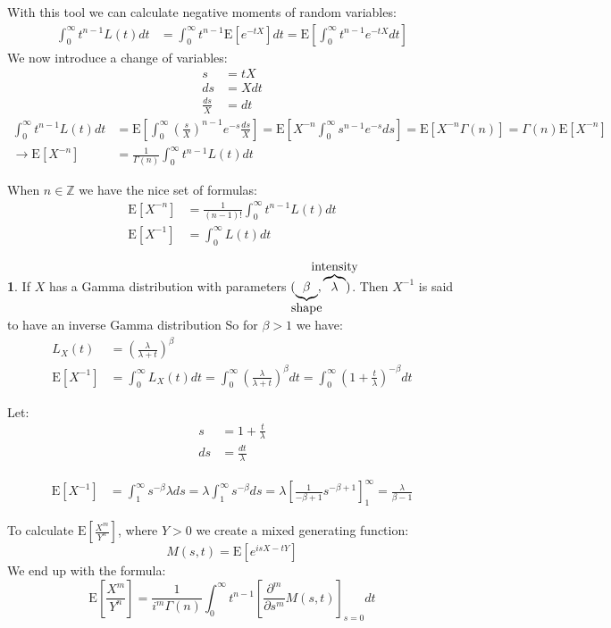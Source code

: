 \documentclass[english,12pt]{article}
\theoremstyle{plain}
\theoremstyle{definition}
\newtheorem*{example}{\protect\examplename}
\theoremstyle{definition} %
\newcommand{\eg}[1]{\begin{example} #1 \end{example} }
\providecommand{\examplename}{Example}
\newcommand{\brac}[1]{\left(#1\right)} %
\newcommand{\sqbrac}[1]{\left[#1\right]} %
\newcommand{\Z}{\mathbb{Z}} %
\newcommand{\ex}[1]{\mbox{E} \left[ #1 \right]}
\begin{document}
With this tool we can calculate negative moments of random variables:
\begin{align*}
\int_0^\infty t^{n-1}L(t)dt&=\int_0^\infty t^{n-1}\ex{e^{-tX}}dt
=\ex{\int_0^\infty t^{n-1}e^{-tX}dt}
\end{align*}
We now introduce a change of variables:
\begin{align*}
s&=tX\\
ds&=Xdt\\
\frac{ds}{X}&=dt
\end{align*}
\begin{align*}
\int_0^\infty t^{n-1}L(t)dt
&=\ex{\int_0^\infty\brac{\frac{s}{X}}^{n-1}e^{-s}\frac{ds}{X}}
=\ex{X^{-n}\int_0^\infty s^{n-1}e^{-s}ds}
=\ex{X^{-n}\Gamma(n)}
=\Gamma(n)\ex{X^{-n}}\\
\rightarrow\ex{X^{-n}}&=\frac{1}{\Gamma(n)}\int_0^\infty t^{n-1}L(t)dt
\end{align*}

When $n\in\Z$ we have the nice set of formulas:
\begin{align*}
\ex{X^{-n}}&=\frac{1}{(n-1)!}\int_0^\infty t^{n-1}L(t)dt\\
\ex{X^{-1}}&=\int_0^\infty L(t)dt
\end{align*}

\eg{
If $X$ has a Gamma distribution with parameters $(\underbrace{\beta}_{\clap{{\text{shape}}}},\overbrace{\lambda}^{\clap{{\text{intensity}}}})$.  Then $X^{-1}$ is said to have an inverse Gamma distribution  So for $\beta>1$ we have:
\begin{align*}
L_X(t)&=\brac{\frac{\lambda}{\lambda+t}}^\beta\\
\ex{X^{-1}}&=\int_0^\infty L_X(t)dt
=\int_0^\infty \brac{\frac{\lambda}{\lambda+t}}^\beta dt
=\int_0^\infty\brac{1+\frac{t}{\lambda}}^{-\beta}dt
\end{align*}

Let:
\begin{align*}
s&=1+\frac{t}{\lambda}\\
ds&=\frac{dt}{\lambda}
\end{align*}

\begin{align*}
\ex{X^{-1}}&=\int_1^\infty s^{-\beta}\lambda ds
=\lambda\int_1^\infty s^{-\beta}ds
=\lambda\sqbrac{\frac{1}{-\beta+1}s^{-\beta+1}}_1^\infty
=\frac{\lambda}{\beta-1}
\end{align*}
}

To calculate $\ex{\frac{X^m}{Y^n}}$, where $Y>0$ we create a mixed generating function:
\[M(s,t)=\ex{e^{isX-tY}}\]
We end up with the formula:
\[\ex{\frac{X^m}{Y^n}}=\frac{1}{i^m\Gamma(n)}\int_0^\infty t^{n-1}\sqbrac{\frac{\partial^m}{\partial s^m}M(s,t)}_{s=0}dt\]
\end{document}
